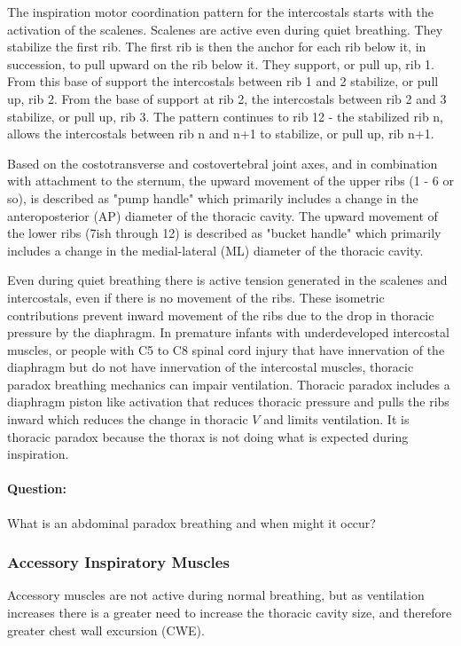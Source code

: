 The inspiration motor coordination pattern for the intercostals starts with the activation of the scalenes. Scalenes are active even during quiet breathing. They stabilize the first rib. The first rib is then the anchor for each rib below it, in succession, to pull upward on the rib below it. They support, or pull up, rib 1. From this base of support the intercostals between rib 1 and 2 stabilize, or pull up, rib 2. From the base of support at rib 2, the intercostals between rib 2 and 3 stabilize, or pull up, rib 3. The pattern continues to rib 12 - the stabilized rib n, allows the intercostals between rib n and n+1 to stabilize, or pull up, rib n+1.

Based on the costotransverse and costovertebral joint axes, and in combination with attachment to the sternum, the upward movement of the upper ribs (1 - 6 or so), is described as "pump handle" which primarily includes a change in the anteroposterior (AP) diameter of the thoracic cavity. The upward movement of the lower ribs (7ish through 12) is described as "bucket handle" which primarily includes a change in the medial-lateral (ML) diameter of the thoracic cavity.

Even during quiet breathing there is active tension generated in the scalenes and intercostals, even if there is no movement of the ribs. These isometric contributions prevent inward movement of the ribs due to the drop in thoracic pressure by the diaphragm. In premature infants with underdeveloped intercostal muscles, or people with C5 to C8 spinal cord injury that have innervation of the diaphragm but do not have innervation of the intercostal muscles, thoracic paradox breathing mechanics can impair ventilation. Thoracic paradox includes a diaphragm piston like activation that reduces thoracic pressure and pulls the ribs inward which reduces the change in thoracic $V$ and limits ventilation. It is thoracic paradox because the thorax is not doing what is expected during inspiration. 

\paragraph{Question:} What is an abdominal paradox breathing and when might it occur?

\subsubsection{Accessory Inspiratory Muscles}
Accessory muscles are not active during normal breathing, but as ventilation increases there is a greater need to increase the thoracic cavity size, and therefore greater chest wall excursion (CWE).


